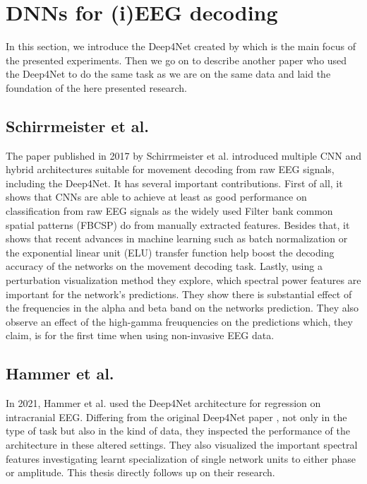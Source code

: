 \section{DNNs for (i)EEG decoding}\label{sec:dnn-decoding}
In this section, we introduce the Deep4Net created by \cite{schirrmeister-deep-2017} which is the main focus of the presented experiments.
Then we go on to describe another paper \cite{Hammer-2021} who used the Deep4Net to do the same task as we are on the same data and laid the foundation of the here presented research.

\subsection{Schirrmeister et al.}
The paper \cite{schirrmeister-deep-2017} published in 2017 by Schirrmeister et al. introduced multiple CNN and hybrid architectures suitable for movement decoding from raw EEG signals, including the Deep4Net.
It has several important contributions.
First of all, it shows that CNNs are able to achieve at least as good performance on classification from raw EEG signals as the widely used Filter bank common spatial patterns (FBCSP) do from manually extracted features. Besides that, it shows that recent advances in machine learning such as batch normalization or the exponential linear unit (ELU) transfer function help boost the decoding accuracy of the networks on the movement decoding task.
Lastly, using a perturbation visualization method they explore, which spectral power features are important for the network's predictions.
They show there is substantial effect of the frequencies in the alpha and beta band on the networks prediction.
They also observe an effect of the high-gamma freuquencies on the predictions which, they claim, is for the first time when using non-invasive EEG data.\\



\subsection{Hammer et al.}
In 2021, Hammer et al. \cite{Hammer-2021} used the Deep4Net architecture for regression on intracranial EEG.
Differing from the original Deep4Net paper \cite{schirrmeister-deep-2017}, not only in the type of task but also in the kind of data, they inspected the performance of the architecture in these altered settings.
They also visualized the important spectral features investigating learnt specialization of single network units to either phase or amplitude.
This thesis directly follows up on their research.

